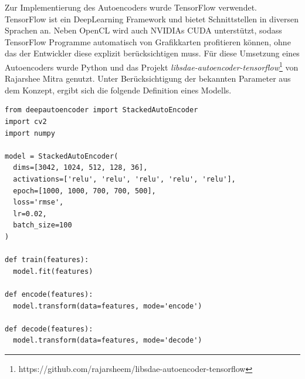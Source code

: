 Zur Implementierung des Autoencoders wurde TensorFlow verwendet. TensorFlow ist ein DeepLearning Framework und bietet Schnittstellen in diversen Sprachen an. Neben OpenCL wird auch NVIDIAs CUDA unterstützt, sodass TensorFlow Programme automatisch von Grafikkarten profitieren können, ohne das der Entwickler diese explizit berücksichtigen muss. Für diese Umsetzung eines Autoencoders wurde Python und das Projekt \textit{libsdae-autoencoder-tensorflow}\footnote{https://github.com/rajarsheem/libsdae-autoencoder-tensorflow} von Rajarshee Mitra genutzt. Unter Berücksichtigung der bekannten Parameter aus dem Konzept, ergibt sich die folgende Definition eines Modells.

\lstset{language=Python}
\begin{lstlisting}
from deepautoencoder import StackedAutoEncoder
import cv2
import numpy

model = StackedAutoEncoder(
  dims=[3042, 1024, 512, 128, 36],
  activations=['relu', 'relu', 'relu', 'relu', 'relu'], 
  epoch=[1000, 1000, 700, 700, 500], 
  loss='rmse', 
  lr=0.02, 
  batch_size=100
)

def train(features):
  model.fit(features)

def encode(features):
  model.transform(data=features, mode='encode')
  
def decode(features):
  model.transform(data=features, mode='decode')
\end{lstlisting}


